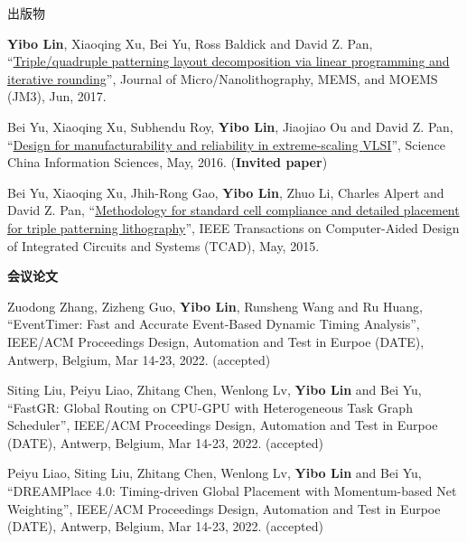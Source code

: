 \begin{rSection}{出版物}
\begin{description}[font=\normalfont]
\item[{[J3]}]{
        \textbf{Yibo Lin}, Xiaoqing Xu, Bei Yu, Ross Baldick and David Z. Pan, 
    ``\href{http://dx.doi.org/10.1117/1.JMM.16.2.023507}{Triple/quadruple patterning layout decomposition via linear programming and iterative rounding}'', 
    Journal of Micro/Nanolithography, MEMS, and MOEMS (JM3), Jun, 2017.
    
}
            

\item[{[J2]}]{
        Bei Yu, Xiaoqing Xu, Subhendu Roy, \textbf{Yibo Lin}, Jiaojiao Ou and David Z. Pan, 
    ``\href{http://link.springer.com/article/10.1007%2Fs11432-016-5560-6}{Design for manufacturability and reliability in extreme-scaling {VLSI}}'', 
    Science China Information Sciences, May, 2016.
    (\textbf{Invited paper})
}
            

\item[{[J1]}]{
        Bei Yu, Xiaoqing Xu, Jhih-Rong Gao, \textbf{Yibo Lin}, Zhuo Li, Charles Alpert and David Z. Pan, 
    ``\href{https://doi.org/10.1109/TCAD.2015.2401571}{Methodology for standard cell compliance and detailed placement for triple patterning lithography}'', 
    IEEE Transactions on Computer-Aided Design of Integrated Circuits and Systems (TCAD), May, 2015.
    
}
            

\end{description}
    

\textbf{会议论文}
        

\begin{description}[font=\normalfont]
    

\item[{[C60]}]{
        Zuodong Zhang, Zizheng Guo, \textbf{Yibo Lin}, Runsheng Wang and Ru Huang, 
    ``EventTimer: Fast and Accurate Event-Based Dynamic Timing Analysis'', 
    IEEE/ACM Proceedings Design, Automation and Test in Eurpoe (DATE), Antwerp, Belgium, Mar 14-23, 2022.
    (accepted)
}
            

\item[{[C59]}]{
        Siting Liu, Peiyu Liao, Zhitang Chen, Wenlong Lv, \textbf{Yibo Lin} and Bei Yu, 
    ``FastGR: Global Routing on CPU-GPU with Heterogeneous Task Graph Scheduler'', 
    IEEE/ACM Proceedings Design, Automation and Test in Eurpoe (DATE), Antwerp, Belgium, Mar 14-23, 2022.
    (accepted)
}
            

\item[{[C58]}]{
        Peiyu Liao, Siting Liu, Zhitang Chen, Wenlong Lv, \textbf{Yibo Lin} and Bei Yu, 
    ``DREAMPlace 4.0: Timing-driven Global Placement with Momentum-based Net Weighting'', 
    IEEE/ACM Proceedings Design, Automation and Test in Eurpoe (DATE), Antwerp, Belgium, Mar 14-23, 2022.
    (accepted)
}
            


\end{description}
\end{rSection}
